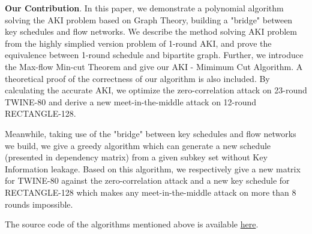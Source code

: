 \begin{bigabstract}
\noindent
\textbf{Our Contribution}. In this paper, we demonstrate a polynomial algorithm solving the AKI problem based on Graph Theory, building a "bridge" between key schedules and flow networks.
We describe the method solving AKI problem from the highly simplied version problem of 1-round AKI, and prove the equivalence between 1-round schedule and bipartite graph.
Further, we introduce the Max-flow Min-cut Theorem and give our AKI - Mimimum Cut Algorithm.
A theoretical proof of the correctness of our algorithm is also included.
By calculating the accurate AKI, we optimize the zero-correlation attack on 23-round TWINE-80 and derive a new meet-in-the-middle attack on 12-round RECTANGLE-128.

Meanwhile, taking use of the "bridge" between key schedules and flow networks we build, we give a greedy algorithm which can generate a new schedule (presented in dependency matrix) from a given subkey set without Key Information leakage.
Based on this algorithm, we respectively give a new matrix for TWINE-80 against the zero-correlation attack and a new key schedule for RECTANGLE-128 which makes any meet-in-the-middle attack on more than 8 rounds impossible.

The source code of the algorithms mentioned above is available \href{https://github.com/KirisameNanami/AKI-Algorithms}{here}.


\end{bigabstract}
